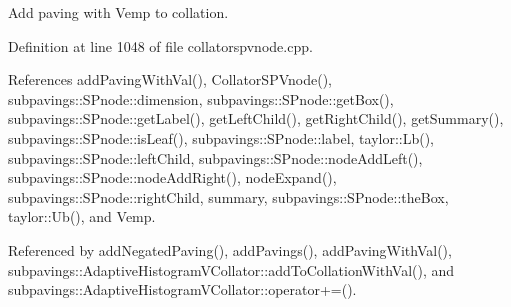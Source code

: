 \-Add paving with \-Vemp to collation. 



\-Definition at line 1048 of file collatorspvnode.\-cpp.



\-References add\-Paving\-With\-Val(), \-Collator\-S\-P\-Vnode(), subpavings\-::\-S\-Pnode\-::dimension, subpavings\-::\-S\-Pnode\-::get\-Box(), subpavings\-::\-S\-Pnode\-::get\-Label(), get\-Left\-Child(), get\-Right\-Child(), get\-Summary(), subpavings\-::\-S\-Pnode\-::is\-Leaf(), subpavings\-::\-S\-Pnode\-::label, taylor\-::\-Lb(), subpavings\-::\-S\-Pnode\-::left\-Child, subpavings\-::\-S\-Pnode\-::node\-Add\-Left(), subpavings\-::\-S\-Pnode\-::node\-Add\-Right(), node\-Expand(), subpavings\-::\-S\-Pnode\-::right\-Child, summary, subpavings\-::\-S\-Pnode\-::the\-Box, taylor\-::\-Ub(), and \-Vemp.



\-Referenced by add\-Negated\-Paving(), add\-Pavings(), add\-Paving\-With\-Val(), subpavings\-::\-Adaptive\-Histogram\-V\-Collator\-::add\-To\-Collation\-With\-Val(), and subpavings\-::\-Adaptive\-Histogram\-V\-Collator\-::operator+=().


